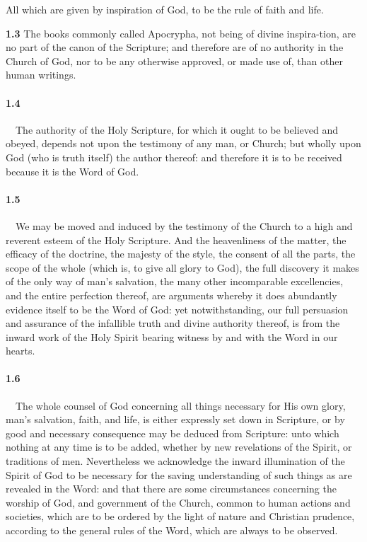 \par All which are given by inspiration of God, to be the rule of faith and life.   

\par\textbf{1.3} The books commonly called Apocrypha, not being of divine inspira-tion, are no part of the canon of the Scripture; and therefore are of no authority in the Church of God, nor to be any otherwise approved, or made use of, than other human writings.   
\bigskip
\paragraph{1.4}\ \ The authority of the Holy Scripture, for which it ought to be believed and obeyed, depends not upon the testimony of any man, or Church; but wholly upon God (who is truth itself) the author thereof: and therefore it is to be received because it is the Word of God.
\bigskip
\paragraph{1.5}\ \ We may be moved and induced by the testimony of the Church to a high and reverent esteem of the Holy Scripture. And the heavenliness of the matter, the efficacy of the doctrine, the majesty of the style, the consent of all the parts, the scope of the whole (which is, to give all glory to God), the full discovery it makes of the only way of man's salvation, the many other incomparable excellencies, and the entire perfection thereof, are arguments whereby it does abundantly evidence itself to be the Word of God: yet notwithstanding, our full persuasion and assurance of the infallible truth and divine authority thereof, is from the inward work of the Holy Spirit bearing witness by and with the Word in our hearts.    
\bigskip
\paragraph{1.6}\ \ The whole counsel of God concerning all things necessary for His own glory, man's salvation, faith, and life, is either expressly set down in Scripture, or by good and necessary consequence may be deduced from Scripture: unto which nothing at any time is to be added, whether by new revelations of the Spirit, or traditions of men. Nevertheless we acknowledge the inward illumination of the Spirit of God to be necessary for the saving understanding of such things as are revealed in the Word: and that there are some circumstances concerning the worship of God, and government of the Church, common to human actions and societies, which are to be ordered by the light of nature and Christian prudence, according to the general rules of the Word, which are always to be observed.   
\bigskip
